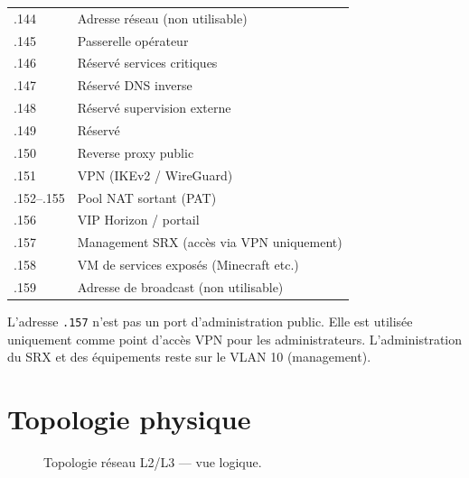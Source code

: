 \begin{xltabular}{\textwidth}{@{}lX@{}}
\toprule
{} &  \\
\midrule
\endhead
\bottomrule
\endfoot
\bottomrule
\endlastfoot
.144    & Adresse réseau (non utilisable) \\
.145    & Passerelle opérateur \\
.146    & Réservé services critiques \\
.147    & Réservé DNS inverse \\
.148    & Réservé supervision externe \\
.149    & Réservé \\
.150    & Reverse proxy public \\
.151    & VPN (IKEv2 / WireGuard) \\
.152–.155 & Pool NAT sortant (PAT) \\
.156    & VIP Horizon / portail \\
.157    & Management SRX (accès via VPN uniquement) \\
.158    & VM de services exposés (Minecraft etc.) \\
.159    & Adresse de broadcast (non utilisable) \\

\end{xltabular}

\begin{warnbox}
L'adresse \texttt{.157} n'est pas un port d'administration public. Elle est utilisée uniquement comme point d'accès VPN pour les administrateurs. L'administration du SRX et des équipements reste sur le VLAN 10 (management).
\end{warnbox}

\section{Topologie physique}
\begin{figure}[H]
\centering\vspace{2pt}

\caption{Topologie réseau L2/L3 — vue logique.}
\label{fig:reseau-l2l3}
\end{figure}

